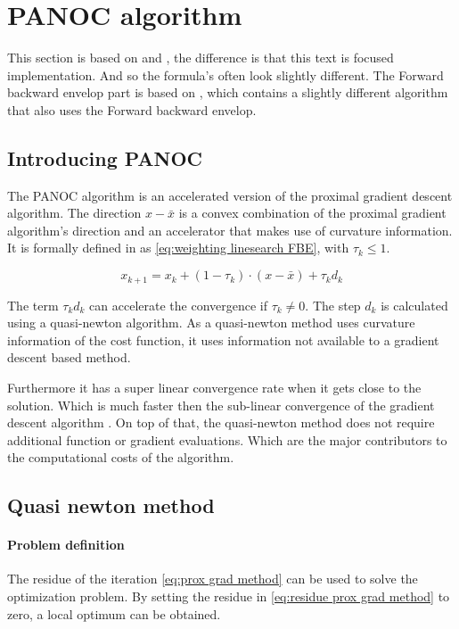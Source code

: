 \chapter{PANOC algorithm}
	This section is based on \cite{LorenzoStella2017} and \cite{AjaySathya2017}, the difference is that this text is focused implementation. And so the formula's often look slightly different. The Forward backward envelop part is based on \cite{Themelis}, which contains a slightly different algorithm that also uses the Forward backward envelop.
	\section{Introducing PANOC}
		The PANOC algorithm is an accelerated version of the proximal gradient descent algorithm. The direction  $x-\bar{x}$ is a convex combination of the proximal gradient algorithm's direction and an accelerator that makes use of curvature information. It is formally defined in \cite{LorenzoStella2017} as \eqref{eq:weighting linesearch FBE}, with $\tau_k \leq 1$.
		
		\begin{equation}
			x_{k+1} = x_k + (1-\tau_k)\cdot (x-\bar{x}) + \tau_k d_k
			\label{eq:weighting linesearch FBE}
		\end{equation}
		
		The term $\tau_kd_k$ can accelerate the convergence if $\tau_k\neq0$. The step $d_k$ is calculated using a quasi-newton algorithm. As a quasi-newton method uses curvature information of the cost function, it uses information not available to a gradient descent based method. 
		
		Furthermore it has a super linear convergence rate when it gets close to the solution. Which is much faster then the sub-linear convergence of the gradient descent algorithm . On top of that, the quasi-newton method does not require additional function or gradient evaluations. Which are the major contributors to the computational costs of the algorithm.
		
	\section{Quasi newton method}
		\subsubsection{Problem definition}
			The residue of the iteration \eqref{eq:prox grad method} can be used to solve the optimization problem.  By setting the residue in \eqref{eq:residue prox grad method} to zero, a local optimum can be obtained.
			
